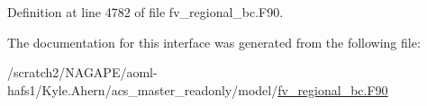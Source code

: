 Definition at line 4782 of file fv\-\_\-regional\-\_\-bc.\-F90.



The documentation for this interface was generated from the following file\-:\begin{DoxyCompactItemize}
\item 
/scratch2/\-N\-A\-G\-A\-P\-E/aoml-\/hafs1/\-Kyle.\-Ahern/acs\-\_\-master\-\_\-readonly/model/\hyperlink{fv__regional__bc_8F90}{fv\-\_\-regional\-\_\-bc.\-F90}\end{DoxyCompactItemize}
